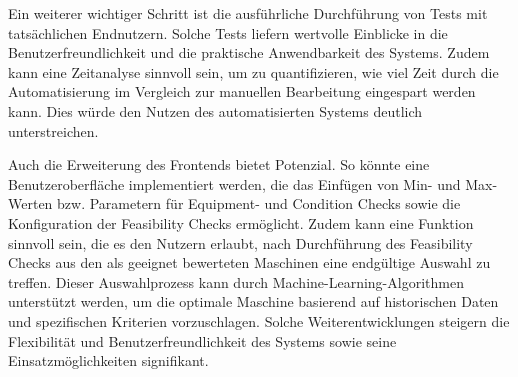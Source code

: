 Ein weiterer wichtiger Schritt ist die ausführliche Durchführung von Tests mit tatsächlichen Endnutzern. Solche Tests liefern wertvolle Einblicke in die Benutzerfreundlichkeit und die praktische Anwendbarkeit des Systems. Zudem kann eine Zeitanalyse sinnvoll sein, um zu quantifizieren, wie viel Zeit durch die Automatisierung im Vergleich zur manuellen Bearbeitung eingespart werden kann. Dies würde den Nutzen des automatisierten Systems deutlich unterstreichen.

Auch die Erweiterung des Frontends bietet Potenzial. So könnte eine Benutzeroberfläche implementiert werden, die das Einfügen von Min- und Max-Werten bzw. Parametern für Equipment- und Condition Checks sowie die Konfiguration der Feasibility Checks ermöglicht. Zudem kann eine Funktion sinnvoll sein, die es den Nutzern erlaubt, nach Durchführung des Feasibility Checks aus den als geeignet bewerteten Maschinen eine endgültige Auswahl zu treffen. Dieser Auswahlprozess kann durch Machine-Learning-Algorithmen unterstützt werden, um die optimale Maschine basierend auf historischen Daten und spezifischen Kriterien vorzuschlagen. Solche Weiterentwicklungen steigern die Flexibilität und Benutzerfreundlichkeit des Systems sowie seine Einsatzmöglichkeiten signifikant.
